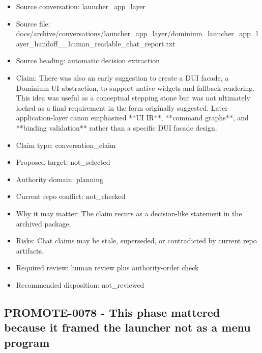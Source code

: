 \documentclass[11pt,a4paper]{report}
\begin{document}
\begin{itemize}
\item Source conversation: launcher\_app\_layer
\item Source file: docs/archive/conversations/launcher\_app\_layer/dominium\_launcher\_app\_layer\_handoff\_\_human\_readable\_chat\_report.txt
\item Source heading: automatic decision extraction
\item Claim: There was also an early suggestion to create a DUI facade, a Dominium UI abstraction, to support native widgets and fallback rendering. This idea was useful as a conceptual stepping stone but was not ultimately locked as a final requirement in the form originally suggested. Later application-layer canon emphasized **UI IR**, **command graphs**, and **binding validation** rather than a specific DUI facade design.
\item Claim type: conversation\_claim
\item Proposed target: not\_selected
\item Authority domain: planning
\item Current repo conflict: not\_checked
\item Why it may matter: The claim recurs as a decision-like statement in the archived package.
\item Risks: Chat claims may be stale, superseded, or contradicted by current repo artifacts.
\item Required review: human review plus authority-order check
\item Recommended disposition: not\_reviewed
\end{itemize}

\subsection{PROMOTE-0078 - This phase mattered because it framed the launcher not as a menu program}
\end{document}
